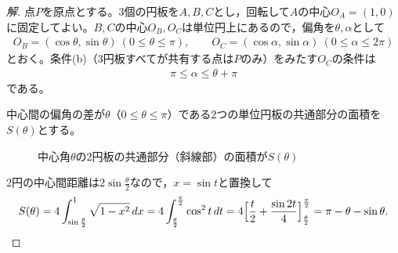 \documentclass[../main.tex]{subfiles}
\begin{document}
\begin{proof}[解]
  点$P$を原点とする。3個の円板を$A,B,C$とし，回転して$A$の中心$O_A=(1,0)$に固定してよい。$B,C$の中心$O_B,O_C$は単位円上にあるので，偏角を$\theta,\alpha$として
  \begin{align*}
    O_B=(\cos\theta,\sin\theta)\ (0\le\theta\le\pi),\qquad O_C=(\cos\alpha,\sin\alpha)\ (0\le\alpha\le2\pi)
  \end{align*}
  とおく。条件(b)（3円板すべてが共有する点は$P$のみ）をみたす$O_C$の条件は
  \begin{align*}
    \pi\le\alpha\le\theta+\pi\tag{①}
  \end{align*}
  である。

  中心間の偏角の差が$\theta$（$0\le\theta\le\pi$）である2つの単位円板の共通部分の面積を$S(\theta)$とする。

  \begin{figure}[htb]
    \centering
    \caption{中心角$\theta$の2円板の共通部分（斜線部）の面積が$S(\theta)$}
  \end{figure}

  2円の中心間距離は$2\sin\frac\theta2$なので，$x=\sin t$と置換して
  \begin{align*}
    S(\theta)=4\int_{\sin\frac\theta2}^1\sqrt{1-x^2}\,dx=4\int_{\frac\theta2}^{\frac\pi2}\cos^2t\,dt=4\Bigl[\frac t2+\frac{\sin2t}4\Bigr]_{\frac\theta2}^{\frac\pi2}=\pi-\theta-\sin\theta.
  \end{align*}


\end{proof}
\end{document}

